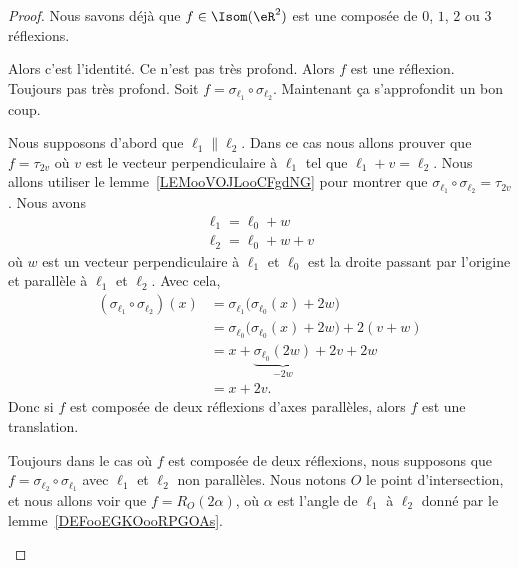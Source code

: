 \begin{proof}
	Nous savons déjà que \( f\in \Isom(\eR^2)\) est une composée de \( 0\), \( 1\), \( 2\) ou \( 3\) réflexions.
	\begin{subproof}
		Alors c'est l'identité. Ce n'est pas très profond.
		Alors \( f\) est une réflexion. Toujours pas très profond.
		Soit \( f=\sigma_{\ell_1}\circ\sigma_{\ell_2}\). Maintenant ça s'approfondit un bon coup.

		Nous supposons d'abord que \( \ell_1\parallel\ell_2\). Dans ce cas nous allons prouver que \( f=\tau_{2v}\) où \( v\) est le vecteur perpendiculaire à \(  \ell_1 \) tel que \( \ell_1+v=\ell_2\). Nous allons utiliser le lemme~\ref{LEMooVOJLooCFgdNG} pour montrer que \( \sigma_{\ell_1}\circ\sigma_{\ell_2}=\tau_{2v}\). Nous avons
		\begin{subequations}
			\begin{align}
				\ell_1=\ell_0+w \\
				\ell_2=\ell_0+w+v
			\end{align}
		\end{subequations}
		où \( w\) est un vecteur perpendiculaire à \( \ell_1\) et \( \ell_0\) est la droite passant par l'origine et parallèle à \( \ell_1\) et \( \ell_2\). Avec cela,
		\begin{subequations}
			\begin{align}
				(\sigma_{\ell_1}\circ\sigma_{\ell_2})(x) & =\sigma_{\ell_1}\big( \sigma_{\ell_0}(x)+2w \big)        \\
				                                         & =\sigma_{\ell_0}\big( \sigma_{\ell_0}(x)+2w \big)+2(v+w) \\
				                                         & =x+\underbrace{\sigma_{\ell_0}(2w)}_{-2w}+2v+2w          \\
				                                         & =x+2v.
			\end{align}
		\end{subequations}
		Donc si \( f\) est composée de deux réflexions d'axes parallèles, alors \( f\) est une translation.

		Toujours dans le cas où \( f\) est composée de deux réflexions, nous supposons que \( f=\sigma_{\ell_2}\circ\sigma_{\ell_1}\) avec \( \ell_1\) et \( \ell_2\) non parallèles. Nous notons \( O\) le point d'intersection, et nous allons voir que \( f=R_O(2\alpha)\), où \( \alpha\) est l'angle de \( \ell_1\) à \( \ell_2\) donné par le lemme~\ref{DEFooEGKOooRPGOAs}.


\end{subproof}
\end{proof}

